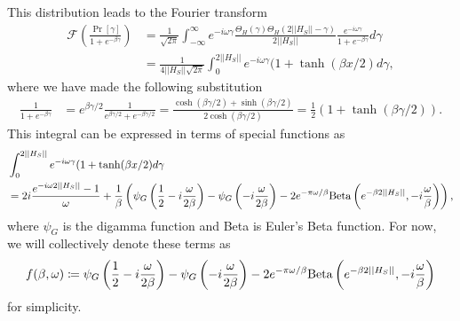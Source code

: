 \documentclass[
 amsmath,amssymb,
 aps,
onecolumn, 
nofootinbib]{revtex4-2}
\newcommand{\parens}[1]{\left( #1 \right)}
\newcommand{\norm}[1]{\left|\left| #1 \right|\right|}
\begin{document}
This distribution leads to the Fourier transform 
\begin{align}
    \mathcal{F}\left(\frac{\Pr[\gamma]}{1 + e^{-\beta \gamma}}\right) &= \frac{1}{\sqrt{2 \pi}}\int_{-\infty}^{\infty} e^{-i \omega \gamma} \frac{\Theta_H(\gamma) \Theta_H(2 \norm{H_S} - \gamma)}{2 \norm{H_S}} \frac{e^{-i \omega \gamma}}{1 + e^{-\beta \gamma}} d \gamma \\
    &= \frac{1}{4 \norm{H_S} \sqrt{2 \pi}} \int_0^{2\norm{H_S}} e^{- i \omega \gamma} (1  +\tanh(\beta x /2) d\gamma,
\end{align}
where we have made the following substitution
\begin{align}
    \frac{1}{1 + e^{-\beta \gamma}} &= e^{\beta \gamma /2 } \frac{1}{e^{\beta \gamma / 2} + e^{-\beta \gamma /2}} = \frac{\cosh(\beta \gamma /2) + \sinh(\beta \gamma /2)}{2 \cosh(\beta \gamma /2)} = \frac{1}{2} (1  +\tanh(\beta \gamma /2)).
\end{align}
This integral can be expressed in terms of special functions as
\begin{align}
    &\int_{0}^{2 \norm{H_S}} e^{- i \omega \gamma} (1  +\tanh(\beta x /2) d\gamma \\
    &= 2i \frac{e^{-i \omega 2 \norm{H_S}} - 1}{\omega} + \frac{1}{\beta} \left( \psi_G\parens{\frac{1}{2} - i \frac{\omega}{2 \beta}} - \psi_G\parens{- i \frac{\omega}{2 \beta}} - 2 e^{- \pi \omega / \beta} {\rm Beta}\left(e^{- \beta 2 \norm{H_S}} , -i \frac{\omega}{\beta}\right)\right),
\end{align}
where $\psi_G$ is the digamma function and Beta is Euler's Beta function. For now, we will collectively denote these terms as
\begin{equation}
    f(\beta, \omega) \coloneqq \psi_G\parens{\frac{1}{2} - i \frac{\omega}{2 \beta}} - \psi_G\parens{- i \frac{\omega}{2 \beta}} - 2 e^{- \pi \omega / \beta} {\rm Beta} \left(e^{- \beta 2 \norm{H_S}} , -i \frac{\omega}{\beta}\right)
\end{equation}
for simplicity. 
\end{document}
